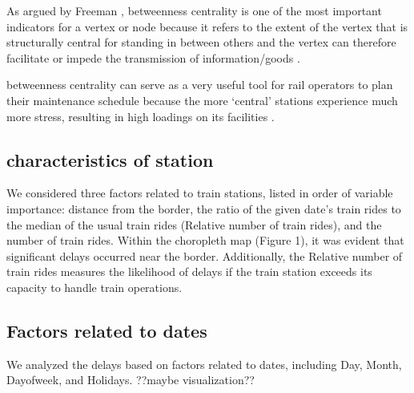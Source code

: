 \documentclass{article}
\theoremstyle{plain}
\theoremstyle{definition}
\theoremstyle{remark}
\begin{document}
As argued by Freeman \cite{betweenness}, betweenness centrality is one of the most important indicators for a vertex or node because it refers to the extent of the vertex that is structurally central for standing in between others and the vertex can therefore facilitate or impede the transmission of information/goods \cite{centrality}.

betweenness centrality can serve as a very useful tool for rail operators to plan their maintenance schedule because the more ‘central’ stations experience much more stress, resulting in high loadings on its facilities \cite{centrality}.

\subsection{{characteristics of station}}

We considered three factors related to train stations, listed in order of variable importance: distance from the border, the ratio of the given date's train rides to the median of the usual train rides (Relative number of train rides), and the number of train rides. Within the choropleth map (Figure 1), it was evident that significant delays occurred near the border. Additionally, the Relative number of train rides measures the likelihood of delays if the train station exceeds its capacity to handle train operations.

\subsection{{Factors related to dates}}

We analyzed the delays based on factors related to dates, including Day, Month, Dayofweek, and Holidays.
??maybe visualization??





\end{document}
